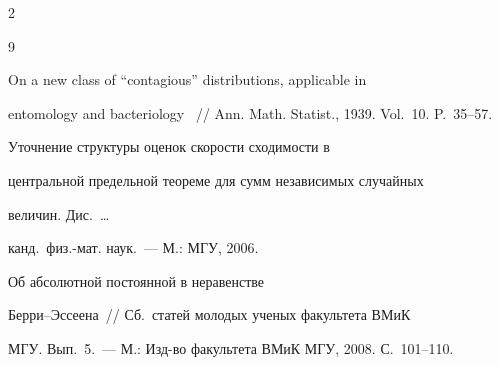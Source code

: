 \begin{multicols}{2}
{{\begin{thebibliography}{9}


On a new class of ``contagious'' distributions, applicable in


entomology and bacteriology~ // Ann. Math. Statist., 1939. Vol.~10. P.~35--57. %









Уточнение структуры оценок ско\-рости сходимости в


центральной предельной теореме для сумм независимых случайных


величин. Дис.\ \ldots %


канд.\ физ.-мат. наук.~--- М.: МГУ, 2006. %





 \label{end\stat}









Об абсолютной постоянной в неравенстве


Берри--Эссеена~// Сб.\ статей молодых ученых факультета ВМиК


МГУ. Вып.~5.~--- М.: Изд-во факультета ВМиК МГУ, 2008. С.~101--110. %











\end{thebibliography}


}


}


\end{multicols}  


 


